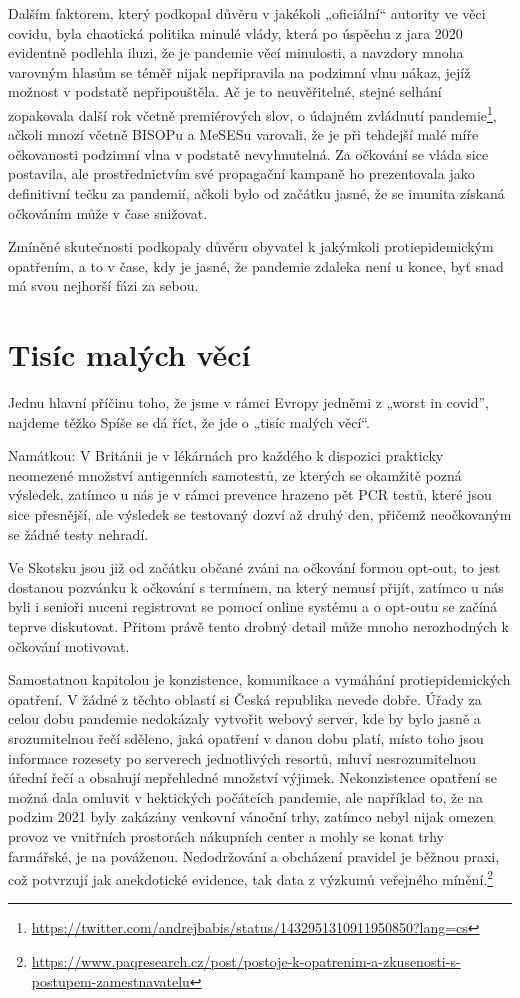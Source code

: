 Dalším faktorem, který podkopal důvěru v jakékoli „oficiální“ autority ve věci covidu, byla chaotická politika minulé vlády, která po úspěchu z jara 2020 evidentně podlehla iluzi, že je pandemie věcí minulosti, a navzdory mnoha varovným hlasům se téměř nijak nepřipravila na podzimní vlnu nákaz, jejíž možnost v podstatě nepřipouštěla. Ač je to neuvěřitelné, stejné selhání zopakovala další rok včetně premiérových slov, o údajném zvládnutí pandemie\footnote{\url{https://twitter.com/andrejbabis/status/1432951310911950850?lang=cs}}, ačkoli mnozí včetně BISOPu a MeSESu varovali, že je při tehdejší malé míře očkovanosti podzimní vlna v podstatě nevyhnutelná. Za očkování se vláda sice postavila, ale prostřednictvím své propagační kampaně ho prezentovala jako definitivní tečku za pandemií, ačkoli bylo od začátku jasné, že se imunita získaná očkováním může v čase snižovat. 

Zmíněné skutečnosti podkopaly důvěru obyvatel k jakýmkoli protiepidemickým opatřením, a to v čase, kdy je jasné, že pandemie zdaleka není u konce, byť snad má svou nejhorší fázi za sebou.

\section*{Tisíc malých věcí}

Jednu hlavní příčinu toho, že jsme v rámci Evropy jedněmi z „worst in
covid”, najdeme těžko Spíše se dá říct, že jde o „tisíc malých věcí“.

Namátkou: V Británii je v lékárnách pro každého k dispozici prakticky neomezené množství antigenních samotestů, ze kterých se okamžitě pozná výsledek, zatímco u nás je v rámci prevence hrazeno pět PCR testů, které jsou sice přesnější, ale výsledek se testovaný dozví až druhý den, přičemž neočkovaným se žádné testy nehradí. 

Ve Skotsku jsou již od začátku občané zváni na očkování formou opt-out, to jest dostanou pozvánku k očkování s termínem, na který nemusí přijít, zatímco u nás byli i senioři nuceni registrovat se pomocí online systému a o opt-outu se začíná teprve diskutovat. Přitom právě tento drobný detail může mnoho nerozhodných k očkování motivovat.

Samostatnou kapitolou je konzistence, komunikace a vymáhání protiepidemických opatření. V žádné z těchto oblastí si Česká republika nevede dobře. Úřady za celou dobu pandemie nedokázaly vytvořit webový server, kde by bylo jasně a srozumitelnou řečí sděleno, jaká opatření v danou dobu platí, místo toho jsou informace rozesety po serverech jednotlivých resortů, mluví nesrozumitelnou úřední řečí a obsahují nepřehledné množství výjimek. Nekonzistence opatření se možná dala omluvit v hektických počátcích pandemie, ale například to, že na podzim 2021 byly zakázány venkovní vánoční trhy, zatímco nebyl nijak omezen provoz ve vnitřních prostorách nákupních center a mohly se konat trhy farmářské, je na pováženou. Nedodržování a obcházení pravidel je běžnou praxi, což potvrzují jak anekdotické evidence, tak data z výzkumů veřejného mínění.\footnote{\url{https://www.paqresearch.cz/post/postoje-k-opatrenim-a-zkusenosti-s-postupem-zamestnavatelu}}

